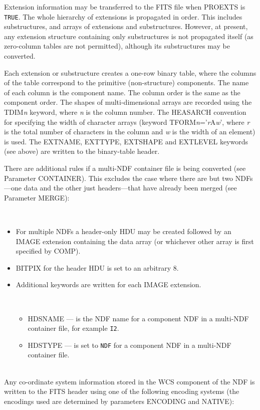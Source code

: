 \documentclass[twoside,11pt]{article}
\newcommand{\latex}[1]{#1}
\newcommand{\sstdiytopic}[2]{\goodbreak \item[{\hspace{-0.35em}#1\hspace{-0.35em}:}] \mbox{} \\[1.3ex] #2}
\newcommand{\ssthitemlist}[1]{
  \latex{
  \mbox{} \\
  \vspace{-3.5ex}
  }
  \begin{itemize}
     #1
  \end{itemize}
}
\newcommand{\sstitem}{\item}
\newcommand{\sstdiytopic}[2]{\\ \item[{#1}:]
      \begin{description}
         #2
      \end{description}
   }
\newcommand{\sstitem}{\item}
\begin{document}
{{{         \sstitem
         Extension information may be transferred to the FITS file when
         PROEXTS is \texttt{TRUE}.
         The whole hierarchy of extensions is propagated
         in order.  This includes substructures, and arrays of extensions
         and substructures.  However, at present, any extension structure
         containing only substructures is not propagated itself (as
         zero-column tables are not permitted), although its
         substructures may be converted.
 
         Each extension or substructure creates a one-row binary table,
         where the columns of the table correspond to the primitive
         (non-structure) components.  The name of each column is the
         component name.  The column order is the same as the component
         order.  The shapes of multi-dimensional arrays are recorded using
         the TDIM\textit{n} keyword, where \textit{n} is the column number.
         The HEASARCH convention for specifying the width of character arrays 
         (keyword TFORM\textit{n}='\textit{r}A\textit{w}', where \textit{r} is
         the total number of characters in the column and \textit{w} is the 
         width of an element) is used.  The EXTNAME,
         EXTTYPE, EXTSHAPE and EXTLEVEL keywords (see above) are written
         to the binary-table header.

      }
      There are additional rules if a multi-NDF container file is being
      converted (see Parameter CONTAINER).  This excludes the case where
      there are but two NDFs---one data and the other just 
      headers---that have already been merged (see Parameter MERGE):
      \ssthitemlist{

         \sstitem
            For multiple NDFs a header-only HDU may be created followed 
            by an IMAGE extension containing the data array (or 
            whichever other array is first specified by COMP).
         \sstitem
            BITPIX for the header HDU is set to an arbitrary 8.
         \sstitem
            Additional keywords are written for each IMAGE extension.
         \ssthitemlist{
            \sstitem
             HDSNAME --- is the NDF name for a component NDF in a multi-NDF
               container file, for example \texttt{I2}.
             \sstitem
             HDSTYPE --- is set to \texttt{NDF} for a component NDF in a 
               multi-NDF container file.
         }
      }      
   }
   \sstdiytopic{
      \label{world_coordinate_systems}World Co-ordinate Systems
   }{
      Any co-ordinate system information stored in the WCS component of the
      NDF is written to the FITS header using one of the following encoding
      systems (the encodings used are determined by parameters ENCODING and 
      NATIVE):
      \ssthitemlist{

}}}
\end{document}

